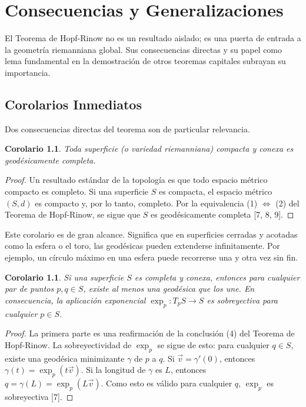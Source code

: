 \documentclass[12pt, a4paper]{report}
\theoremstyle{miestilo}
\newtheorem{corolario}[teorema]{Corolario}
\theoremstyle{midefinicion}
\begin{document}
\chapter{Consecuencias y Generalizaciones}

El Teorema de Hopf-Rinow no es un resultado aislado; es una puerta de entrada a la geometría riemanniana global. Sus consecuencias directas y su papel como lema fundamental en la demostración de otros teoremas capitales subrayan su importancia.

\section{Corolarios Inmediatos}

Dos consecuencias directas del teorema son de particular relevancia.

\begin{corolario}
Toda superficie (o variedad riemanniana) compacta y conexa es geodésicamente completa.
\end{corolario}
\begin{proof}
Un resultado estándar de la topología es que todo espacio métrico compacto es completo. Si una superficie $S$ es compacta, el espacio métrico $(S,d)$ es compacto y, por lo tanto, completo. Por la equivalencia (1) $\Leftrightarrow$ (2) del Teorema de Hopf-Rinow, se sigue que $S$ es geodésicamente completa [7, 8, 9].
\end{proof}

Este corolario es de gran alcance. Significa que en superficies cerradas y acotadas como la esfera o el toro, las geodésicas pueden extenderse infinitamente. Por ejemplo, un círculo máximo en una esfera puede recorrerse una y otra vez sin fin.

\begin{corolario}
Si una superficie $S$ es completa y conexa, entonces para cualquier par de puntos $p, q \in S$, existe al menos una geodésica que los une. En consecuencia, la aplicación exponencial $\exp_p: T_pS \to S$ es sobreyectiva para cualquier $p \in S$.
\end{corolario}
\begin{proof}
La primera parte es una reafirmación de la conclusión (4) del Teorema de Hopf-Rinow. La sobreyectividad de $\exp_p$ se sigue de esto: para cualquier $q \in S$, existe una geodésica minimizante $\gamma$ de $p$ a $q$. Si $\vec{v} = \gamma'(0)$, entonces $\gamma(t) = \exp_p(t\vec{v})$. Si la longitud de $\gamma$ es $L$, entonces $q = \gamma(L) = \exp_p(L\vec{v})$. Como esto es válido para cualquier $q$, $\exp_p$ es sobreyectiva [7].
\end{proof}
\end{document}
